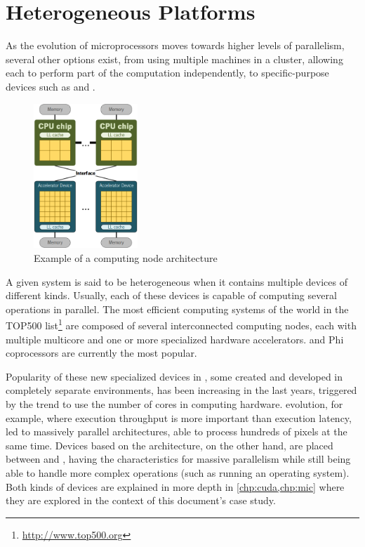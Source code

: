 \documentclass[../thesis]{subfiles}
\begin{document}
	\section{Heterogeneous Platforms}
	\label{sec:techbg:hetplats}

	As the evolution of microprocessors moves towards higher levels of parallelism, several other options exist, from using multiple machines in a cluster, allowing each to perform part of the computation independently, to specific-purpose devices such as \dsps and \gpus.

	\begin{figure}
		\centering
		\includegraphics[width=0.35\textwidth]{assets/images/techbg/hetplat.png}
		\captionsetup{font=small}
		\caption{Example of a computing node architecture}
		\label{fig:cudacore}
	\end{figure}

	A given system is said to be heterogeneous when it contains multiple devices of different kinds. Usually, each of these devices is capable of computing several operations in parallel. The most efficient computing systems of the world in the TOP500 list\footnote{\url{http://www.top500.org}} are composed of several interconnected computing nodes, each with multiple multicore \cpus and one or more specialized hardware accelerators. \gpus and \intel\xeon Phi coprocessors are currently the most popular.

	Popularity of these new specialized devices in \hpc, some created and developed in completely separate environments, has been increasing in the last years, triggered by the trend to use the number of cores in computing hardware. \gpus evolution, for example, where execution throughput is more important than execution latency, led to massively parallel architectures, able to process hundreds of pixels at the same time. Devices based on the \intel\mic architecture, on the other hand, are placed between \gpus and \cpus, having the characteristics for massive parallelism while still being able to handle more complex operations (such as running an operating system). Both kinds of devices are explained in more depth in \cref{chp:cuda,chp:mic} where they are explored in the context of this document's case study.
\end{document}
